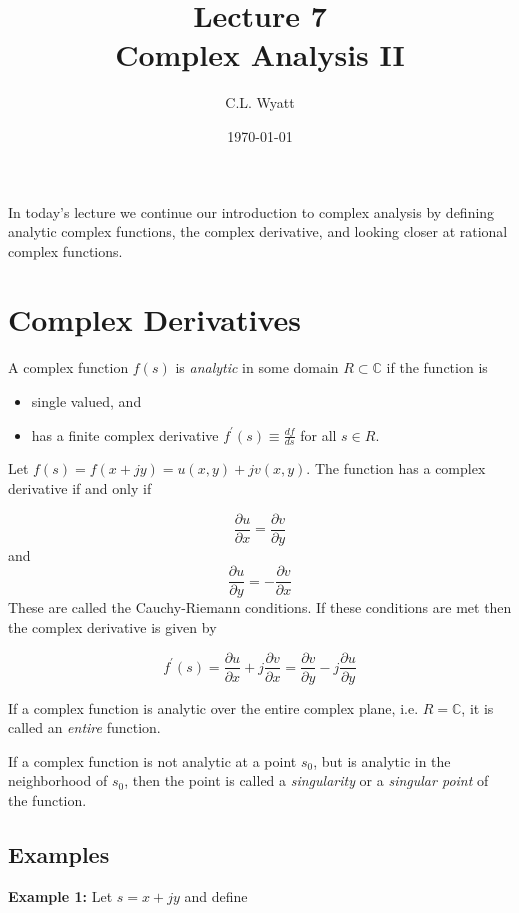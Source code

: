\documentclass{article}
\begin{document}
\title{Lecture 7\\ Complex Analysis II}
\author{C.L. Wyatt}
\date{\today}
\maketitle

In today's lecture we continue our introduction to complex analysis by defining analytic complex functions, the complex derivative, and looking closer at rational complex functions.

\section{Complex Derivatives}

A complex function $f(s)$ is \textit{analytic} in some domain $R\subset\mathbb{C}$ if the function is

\begin{itemize}
\item single valued, and
\item has a finite complex derivative $f^\prime(s) \equiv \frac{df}{ds}$ for all $s\in R$.
\end{itemize}

Let $f(s) = f(x + jy) = u(x,y) + jv(x,y)$. The function has a complex derivative if and only if

\[
\frac{\partial u}{\partial x} = \frac{\partial v}{\partial y}  
\]
and
\[
\frac{\partial u}{\partial y} = -\frac{\partial v}{\partial x}  
\]
These are called the Cauchy-Riemann conditions. If these conditions are met then the complex derivative is given by

\[
f^\prime(s) = \frac{\partial u}{\partial x} + j \frac{\partial v}{\partial x} = \frac{\partial v}{\partial y} - j \frac{\partial u}{\partial y}
\]

If a complex function is analytic over the entire complex plane, i.e. $R = \mathbb{C}$, it is called an \textit{entire} function.

If a complex function is not analytic at a point $s_0$, but is analytic in the neighborhood of $s_0$, then the point is called a \textit{singularity} or a \textit{singular point} of the function.

\subsection{Examples}

\textbf{Example 1:} Let $s = x+jy$ and define
\end{document}
